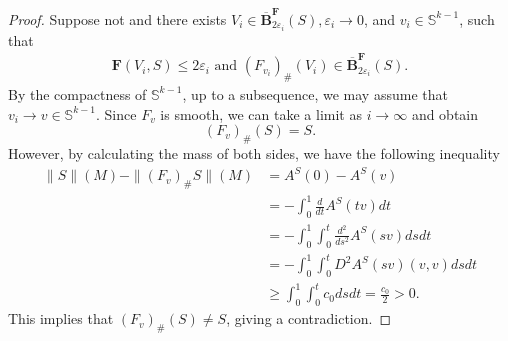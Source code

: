 \documentclass[12pt,english]{article}
\theoremstyle{definition}
\begin{document}
\begin{proof}
Suppose not and there exists $V_i \in \mathbf{\overline{B}}^{\mathbf{F}}_{2\varepsilon_i}(S), \varepsilon_i \rightarrow 0$, and $v_i \in \mathbb S^{k-1}$, such that
\begin{align*}
    \mathbf{F}(V_i, S) \leq 2\varepsilon_i \text{ and } (F_{v_i})_{\#}(V_i) \in \mathbf{\overline{B}}^{\textbf{F}}_{2{\varepsilon}_i}(S).
\end{align*}
By the compactness of $\mathbb S^{k-1}$, up to a subsequence, we may assume that $v_i \rightarrow v \in \mathbb S^{k-1}$. Since $F_v$ is smooth, we can take a limit as $i \rightarrow \infty$ and obtain
\begin{equation*}
    (F_v)_{\#}(S) = S.
\end{equation*}
However, by calculating the mass of both sides, we have the following inequality
\begin{align*}
    \|S\|(M) - \|(F_v)_{\#}S\|(M) &= A^S(0) - A^S(v) \\
    &= - \int_0^1 \frac{d}{dt} A^S (tv) dt \\
    &= - \int_{0}^{1} \int_{0}^{t} \frac{d^2}{ds^2} A^S(sv) ds dt \\
    &= - \int_{0}^{1} \int_{0}^{t} D^2 A^S(sv)(v,v)dsdt \\
    &\geq \int_{0}^{1} \int_{0}^{t} c_0 ds dt = \frac{c_0}{2} > 0.
\end{align*}
This implies that $(F_v)_{\#}(S) \neq S$, giving a contradiction.
\end{proof}
\end{document}
